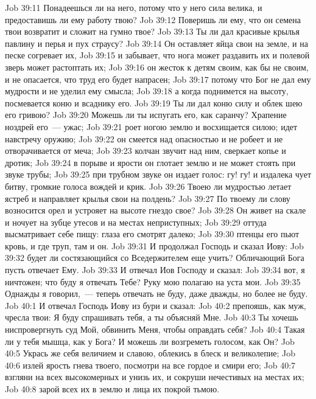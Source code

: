 \vs Job 39:11 Понадеешься ли на него, потому что у него сила велика, и предоставишь ли ему работу твою?
\vs Job 39:12 Поверишь ли ему, что он семена твои возвратит и сложит на гумно твое?
\vs Job 39:13 Ты ли дал красивые крылья павлину и перья и пух страусу?
\vs Job 39:14 Он оставляет яйца свои на земле, и на песке согревает их,
\vs Job 39:15 и забывает, что нога может раздавить их и полевой зверь может растоптать их;
\vs Job 39:16 он жесток к детям своим, как бы не своим, и не опасается, что труд его будет напрасен;
\vs Job 39:17 потому что Бог не дал ему мудрости и не уделил ему смысла;
\vs Job 39:18 а когда поднимется на высоту, посмевается коню и всаднику его.
\vs Job 39:19 Ты ли дал коню силу и облек шею его гривою?
\vs Job 39:20 Можешь ли ты испугать его, как саранчу? Храпение ноздрей его~--- ужас;
\vs Job 39:21 роет ногою землю и восхищается силою; идет навстречу оружию;
\vs Job 39:22 он смеется над опасностью и не робеет и не отворачивается от меча;
\vs Job 39:23 колчан звучит над ним, сверкает копье и дротик;
\vs Job 39:24 в порыве и ярости он глотает землю и не может стоять при звуке трубы;
\vs Job 39:25 при трубном звуке он издает голос: гу! гу! и издалека чует битву, громкие голоса вождей и крик.
\vs Job 39:26 Твоею ли мудростью летает ястреб и направляет крылья свои на полдень?
\vs Job 39:27 По твоему ли слову возносится орел и устрояет на высоте гнездо свое?
\vs Job 39:28 Он живет на скале и ночует на зубце утесов и на местах неприступных;
\vs Job 39:29 оттуда высматривает себе пищу: глаза его смотрят далеко;
\vs Job 39:30 птенцы его пьют кровь, и где труп, там и он.
\vs Job 39:31 И продолжал Господь и сказал Иову:
\vs Job 39:32 будет ли состязающийся со Вседержителем еще учить? Обличающий Бога пусть отвечает Ему.
\vs Job 39:33 И отвечал Иов Господу и сказал:
\vs Job 39:34 вот, я ничтожен; что буду я отвечать Тебе? Руку мою полагаю на уста мои.
\vs Job 39:35 Однажды я говорил,~--- теперь отвечать не буду, даже дважды, но более не буду.
\vs Job 40:1 И отвечал Господь Иову из бури и сказал:
\vs Job 40:2 препояшь, как муж, чресла твои: Я буду спрашивать тебя, а ты объясняй Мне.
\vs Job 40:3 Ты хочешь ниспровергнуть суд Мой, обвинить Меня, чтобы оправдать себя?
\vs Job 40:4 Такая ли у тебя мышца, как у Бога? И можешь ли возгреметь голосом, как Он?
\vs Job 40:5 Укрась же себя величием и славою, облекись в блеск и великолепие;
\vs Job 40:6 излей ярость гнева твоего, посмотри на все гордое и смири его;
\vs Job 40:7 взгляни на всех высокомерных и унизь их, и сокруши нечестивых на местах их;
\vs Job 40:8 зарой всех их в землю и лица их покрой тьмою.
